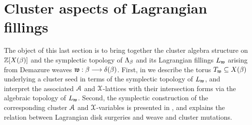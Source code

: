 \section{Cluster aspects of Lagrangian fillings}

The object of this last section is to bring together the cluster algebra structure on $\mathbb{Z}[X(\beta)]$ and the symplectic topology of $\Lambda_\beta$ and its Lagrangian fillings $L_{\mathfrak{w}}$ arising from Demazure weaves $\mathfrak{w}:\beta\longrightarrow\delta(\beta)$. First, in  we describe the torus $T_{\mathfrak{w}}\subseteq X(\beta)$ underlying a cluster seed in terms of the symplectic topology of $L_{\mathfrak{w}}$, and interpret the associated $\mathcal{A}$ and $\mathcal{X}$-lattices with their intersection forms via the algebraic topology of $L_{\mathfrak{w}}$. Second, the symplectic construction of the corresponding cluster $\mathcal{A}$ and $\mathcal{X}$-variables is presented in , and  explains the relation between Lagrangian disk surgeries and weave and cluster mutations.
